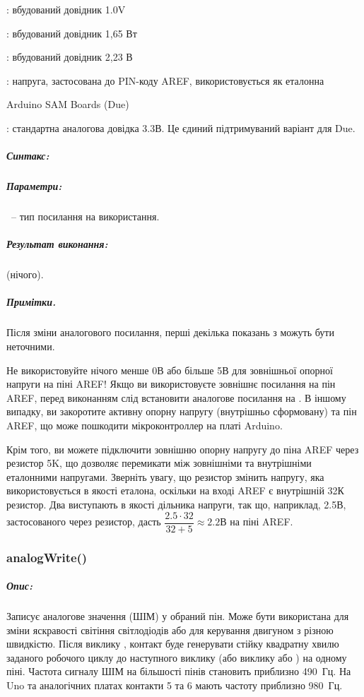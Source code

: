 \documentclass[12pt,a4paper]{report}  %
\begin{document}
    : вбудований довідник 1.0V

    : вбудований довідник 1,65 Вт

    : вбудований довідник 2,23 В

    : напруга, застосована до PIN-коду AREF, використовується як еталонна

Arduino SAM Boards (Due)

    : стандартна аналогова довідка 3.3В. Це єдиний підтримуваний варіант для Due.
    
\subparagraph{Синтакс:} 
\subparagraph{Параметри:}

~-- тип посилання на використання.
\subparagraph{Результат виконання:}  (нічого).

\subparagraph{Примітки.}

Після зміни аналогового посилання, перші декілька показань з  можуть бути неточними.

Не використовуйте нічого менше 0В або більше 5В для зовнішньої опорної напруги на піні AREF! Якщо ви використовуєте зовнішнє посилання на пін AREF, перед виконанням  слід встановити аналогове посилання на . В іншому випадку, ви закоротите активну опорну напругу (внутрішньо сформовану) та пін AREF, що може пошкодити мікроконтроллер на платі Arduino.

Крім того, ви можете підключити зовнішню опорну напругу до піна AREF через резистор 5K, що дозволяє перемикати між зовнішніми та внутрішніми еталонними напругами. Зверніть увагу, що резистор змінить напругу, яка використовується в якості еталона, оскільки на вході AREF є внутрішній 32К резистор. Два виступають в якості дільника напруги, так що, наприклад, 2.5В, застосованого через резистор, дасть $\dfrac{2.5 \cdot 32}{32 + 5} \approx 2.2\text{В}$ на піні AREF.

\subsubsection{analogWrite()}

\subparagraph{Опис:}
Записує аналогове значення (ШІМ) у обраний пін. Може бути використана для зміни яскравості світіння світлодіодів або для керування двигуном з різною швидкістю. Після виклику , контакт буде генерувати стійку квадратну хвилю заданого робочого циклу до наступного виклику  (або виклику  або ) на одному піні. Частота сигналу ШІМ на більшості пінів становить приблизно 490~Гц. На Uno та аналогічних платах контакти 5 та 6 мають частоту приблизно 980~Гц.
\end{document}
